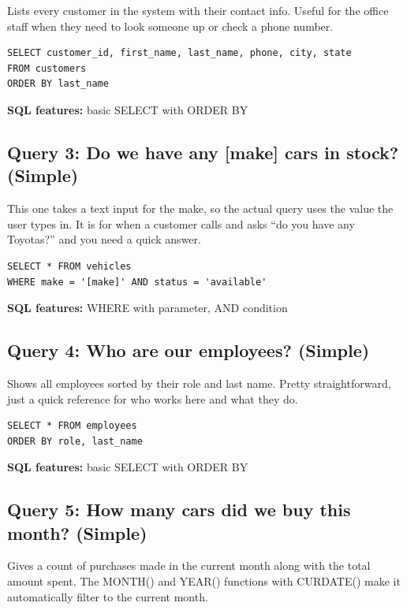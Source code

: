 \documentclass[12pt]{article}
\begin{document}
Lists every customer in the system with their contact info. Useful for the office staff when they need to look someone up or check a phone number.

\begin{lstlisting}[style=sql]
SELECT customer_id, first_name, last_name, phone, city, state
FROM customers
ORDER BY last_name
\end{lstlisting}

\textbf{SQL features:} basic SELECT with ORDER BY

\subsection{Query 3: Do we have any [make] cars in stock? (Simple)}

This one takes a text input for the make, so the actual query uses the value the user types in. It is for when a customer calls and asks ``do you have any Toyotas?'' and you need a quick answer.

\begin{lstlisting}[style=sql]
SELECT * FROM vehicles
WHERE make = '[make]' AND status = 'available'
\end{lstlisting}

\textbf{SQL features:} WHERE with parameter, AND condition

\subsection{Query 4: Who are our employees? (Simple)}

Shows all employees sorted by their role and last name. Pretty straightforward, just a quick reference for who works here and what they do.

\begin{lstlisting}[style=sql]
SELECT * FROM employees
ORDER BY role, last_name
\end{lstlisting}

\textbf{SQL features:} basic SELECT with ORDER BY

\subsection{Query 5: How many cars did we buy this month? (Simple)}

Gives a count of purchases made in the current month along with the total amount spent. The MONTH() and YEAR() functions with CURDATE() make it automatically filter to the current month.
\end{document}
